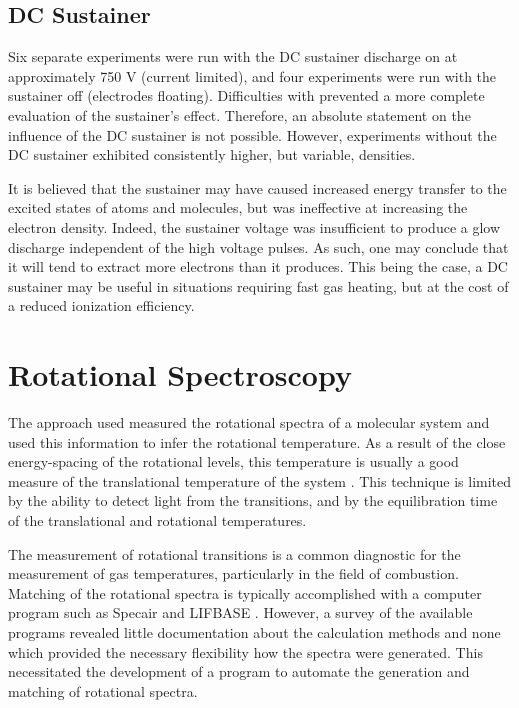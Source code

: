    \subsection{DC Sustainer}
        Six separate experiments were run with the DC sustainer discharge on at approximately 750 V (current limited), and four experiments were run with the sustainer off (electrodes floating). Difficulties with  prevented a more complete evaluation of the sustainer's effect. Therefore, an absolute statement on the influence of the DC sustainer is not possible. However, experiments without the DC sustainer exhibited consistently higher, but variable, densities.

        It is believed that the sustainer may have caused increased energy transfer to the excited states of atoms and molecules, but was ineffective at increasing the electron density. Indeed, the sustainer voltage was insufficient to produce a glow discharge independent of the high voltage pulses. As such, one may conclude that it will tend to extract more electrons than it produces. This being the case, a DC sustainer may be useful in situations requiring fast gas heating, but at the cost of a reduced ionization efficiency.

\section{Rotational Spectroscopy}

The approach used measured the rotational spectra of
a molecular system and used this information to infer the rotational
temperature. As a result of the close energy-spacing of the rotational levels,
this temperature is usually a good measure of the translational temperature of
the system \cite{Laux1993}. This technique is limited by the ability to detect
light from the transitions, and by the equilibration time of the translational
and rotational temperatures.

The measurement of rotational transitions is a common diagnostic for the
measurement of gas temperatures, particularly in the field of combustion.
Matching of the rotational spectra is typically accomplished with a computer
program such as Specair \cite{Laux2002} and LIFBASE \cite{Luque1999}. However, a
survey of the available programs revealed little documentation about the
calculation methods and none which provided the necessary flexibility how the
spectra were generated. This necessitated the development of a program to
automate the generation and matching of rotational spectra.
